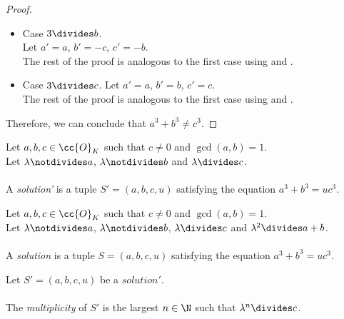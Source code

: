 \begin{proof}
\begin{itemize}
      \item Case $3 \divides b$. \\
      Let $a'=a$, $b'=-c$, $c'=-b$.\\
      The rest of the proof is analogous to the first case using  and
      .
      \item Case $3 \divides c$.
      Let $a'=a$, $b'=b$, $c'=c$.\\
      The rest of the proof is analogous to the first case using  and
      .
  \end{itemize}
  Therefore, we can conclude that $a^3 + b^3 \neq c^3$.
\end{proof}

\begin{definition}[Solution']
  \label{def:Solution1}
  \leanok
  Let $a, b, c \in \cc{O}_K$ such that $c \neq 0$ and $\gcd(a,b)=1$.\\
  Let $\lambda \notdivides a$, $\lambda \notdivides b$ and $\lambda \divides c$. \\\\
  A \textit{solution'} is a tuple $S'=(a, b, c, u)$
  satisfying the equation $a^3 + b^3 = u c^3.$
\end{definition}

\begin{definition}[Solution]
  \label{def:Solution}
  \leanok
  Let $a, b, c \in \cc{O}_K$ such that $c \neq 0$ and $\gcd(a,b)=1$.\\
  Let $\lambda \notdivides a$, $\lambda \notdivides b$, $\lambda \divides c$ and
  $\lambda^2 \divides a+b$. \\\\
  A \textit{solution} is a tuple $S=(a, b, c, u)$
  satisfying the equation $a^3 + b^3 = u c^3$.
\end{definition}

\begin{definition}
  \label{def:Solution1_Multiplicity}
  \leanok
  Let $S'=(a, b, c, u)$ be a $solution'$. \\\\
  The \textit{multiplicity} of $S'$ is the largest $n \in \N$ such that
  $\lambda^n \divides c$.
\end{definition}

